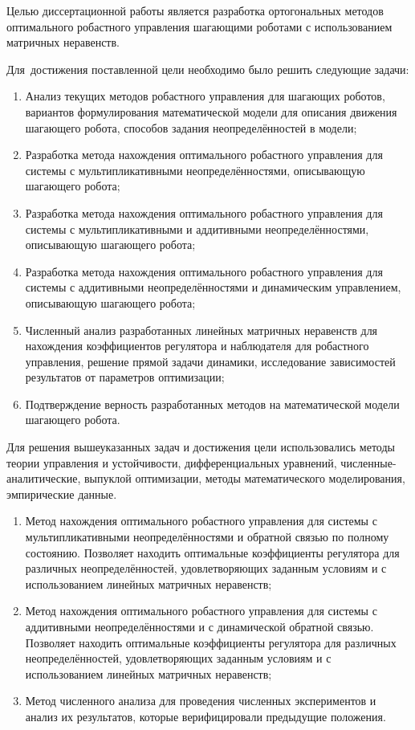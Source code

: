 {\aimtasks} 

Целью диссертационной работы является разработка ортогональных методов оптимального робастного управления шагающими роботами с использованием матричных неравенств.

Для~достижения поставленной цели необходимо было решить следующие задачи:
\begin{enumerate}[beginpenalty=10000] %
	\item Анализ текущих методов робастного управления для шагающих роботов, вариантов формулирования математической модели для описания движения шагающего робота, способов задания неопределённостей в модели;
	\item Разработка метода нахождения оптимального робастного управления для системы с мультипликативными неопределённостями, описывающую шагающего робота;
	\item Разработка метода нахождения оптимального робастного управления для системы с мультипликативными и аддитивными неопределённостями, описывающую шагающего робота;
	\item Разработка метода нахождения оптимального робастного управления для системы с аддитивными неопределённостями и динамическим управлением, описывающую шагающего робота;
	\item Численный анализ разработанных линейных матричных неравенств для нахождения коэффициентов регулятора и наблюдателя для робастного управления, решение прямой задачи динамики, исследование зависимостей результатов от параметров оптимизации;
	\item Подтверждение верность разработанных методов на математической модели шагающего робота.
\end{enumerate}

{\methods} 

Для решения вышеуказанных задач и достижения цели использовались методы теории управления и устойчивости, дифференциальных уравнений, численные-аналитические, выпуклой оптимизации, методы математического моделирования, эмпирические данные.

{}

\begin{enumerate}[beginpenalty=10000] %
	\item Метод нахождения оптимального робастного управления для системы с мультипликативными неопределённостями и обратной связью по полному состоянию. Позволяет находить оптимальные коэффициенты регулятора для различных неопределённостей, удовлетворяющих заданным условиям и с использованием линейных матричных неравенств; 
	\item Метод нахождения оптимального робастного управления для системы с аддитивными неопределённостями и с динамической обратной связью. Позволяет находить оптимальные коэффициенты регулятора для различных неопределённостей, удовлетворяющих заданным условиям и с использованием линейных матричных неравенств; 
	\item Метод численного анализа для проведения численных экспериментов и анализ их результатов, которые верифицировали предыдущие положения.
\end{enumerate}

